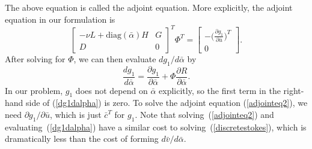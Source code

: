 \documentclass[times]{fldauth}
\begin{document}
The above equation is called the adjoint equation. More explicitly,
the adjoint equation in our formulation is
\begin{equation}
\label{adjointeq2}
  \begin{bmatrix}
     -\nu L + \text{diag}(\bar{\alpha})H   & G\\
     D               &  0
   \end{bmatrix}^T \Phi^T =
  \begin{bmatrix}
    -\big(\frac{\partial{g_1}}{\partial{\bar{u}}}\big)^T\\
    0
   \end{bmatrix}.
\end{equation}
After solving for $\Phi$, we can then evaluate $dg_1/d\bar{\alpha}$ by
\begin{equation}
\label{dg1dalpha}
  \frac{dg_1}{d\bar{\alpha}}
  = \frac{\partial{g_1}}{\partial{\bar{\alpha}}}
  + \Phi \frac{\partial{R}}{\partial{\bar{\alpha}}}.
\end{equation}
In our problem, $g_1$ does not depend on $\bar{\alpha}$ explicitly, so
the first term in the right-hand side of (\ref{dg1dalpha}) is zero. To
solve the adjoint equation (\ref{adjointeq2}), we need
$\partial{g_1}/\partial{\bar{u}}$, which is just $\bar{c}^T$ for
$g_1$. Note that solving~(\ref{adjointeq2}) and
evaluating~(\ref{dg1dalpha}) have a similar cost to
solving~(\ref{discretestokes}), which is dramatically less than the
cost of forming $d\bar{v}/d\bar{\alpha}$.

\end{document}
